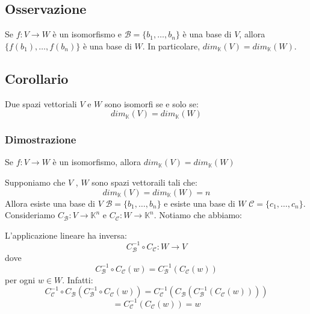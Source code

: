 \documentclass[a4paper]{article}
\theoremstyle{break}
\theoremstyle{break}
\theoremstyle{break}
\theoremstyle{break}
\begin{document}
\subsection{Osservazione}
\label{7.7}
Se \( f: V \to W \) è un isomorfismo e \( \mathcal{B} = \{b_1, \ldots, b_n\}  \) è una
base di \( V \), allora \( \{f(b_1), \ldots, f(b_n)\}  \) è una base di \( W \). In
particolare, \( dim_{\mathbb{K}}(V) = dim_{\mathbb{K}}(W) \).

\subsection{Corollario}
Due spazi vettoriali \( V \) e \( W \) sono isomorfi se e solo se:
\[
  dim_{\mathbb{K}}(V) = dim_{\mathbb{K}}(W)
\] 

\subsubsection{Dimostrazione}
Se \( f: V \to W \) è un isomorfismo, allora \( dim_{\mathbb{K}}(V) = dim_{\mathbb{K}}(W) \) 

\vspace{1em}
\noindent Supponiamo che \( V \) , \( W \) sono spazi vettoraili tali che:
\[
dim_{\mathbb{K}}(V) = dim_{\mathbb{K}}(W) = n
\] 
Allora esiste una base di \( V \) \( \mathcal{B} = \{b_1, \ldots, b_n\}  \) e
esiste una base di \( W \) \( \mathcal{C} = \{c_1, \ldots, c_n\}  \).
Consideriamo \( C_{\mathcal{B}}: V \to \mathbb{K}^n \) e \( C_{\mathcal{C}}: W \to \mathbb{K}^n \).
Notiamo che abbiamo:
\begin{figure}[H]
  \centering
  
\end{figure}
L'applicazione lineare ha inversa:
\[
C_{\mathcal{B}}^{-1} \circ C_{\mathcal{C}}: W \to V
\] 
dove
\[
C_{\mathcal{B}}^{-1} \circ C_{\mathcal{C}}(w) = C_{\mathcal{B}}^{-1}(C_{\mathcal{C}}(w))
\] 
per ogni \( w \in W \). Infatti:
\[
  C_{\mathcal{C}}^{-1} \circ C_{\mathcal{B}}\left( C_{\mathcal{B}}^{-1} \circ C_{\mathcal{C}}(w) \right) =
  C_{\mathcal{C}}^{-1} \left( C_{\mathcal{B}} \left( C_{\mathcal{B}}^{-1} \left( C_{\mathcal{C}}(w) \right)  \right)  \right) 
\] 
\[
  = C_{\mathcal{C}}^{-1} \left( C_{\mathcal{C}}(w) \right) = w
\] 
\end{document}
